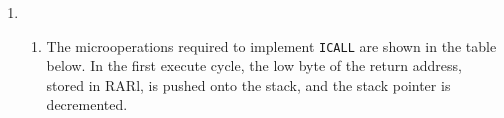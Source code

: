 \documentclass[11pt]{article}
\begin{document}
\begin{enumerate}[leftmargin=0.2in]
\begin{enumerate}
\begin{table}[H]
\begin{tabular}{ll}
\begin{tabular}{|p{0.1\linewidth}|>{\centering\arraybackslash}p{0.1\linewidth}|>{\centering\arraybackslash}p{0.1\linewidth}|>{\centering\arraybackslash}p{0.1\linewidth}|}
            ALU\_f    & xxxx  & xxxx  & xxxx  \\ \hline
            MC        & xx    & xx    & xx    \\ \hline
            RF\_wA    & 0     & 0     & 0     \\ \hline
            RF\_wB    & 0     & 0     & 0     \\ \hline
            MD        & x     & x     & 1     \\ \hline
            ME        & x     & x     & 1     \\ \hline
            DM\_r     & x     & x     & 0     \\ \hline
            DM\_w     & 0     & 0     & 1     \\ \hline
            MF        & x     & 1     & x     \\ \hline
            MG        & x     & 1     & x     \\ \hline
            Adder\_f  & xx    & 00    & xx    \\ \hline
            Inc\_Dec  & x     & x     & x     \\ \hline
            MH        & x     & 1     & x     \\ \hline
            MI        & x     & x     & x     \\ \hline
          \end{tabular}
          &
          \begin{tabular}{|p{0.1\linewidth}|>{\centering\arraybackslash}p{0.1\linewidth}|>{\centering\arraybackslash}p{0.1\linewidth}|}\hline
            \multicolumn{1}{|c|}{\multirow{2}{0.1\linewidth}{RAL Output}} & \multicolumn{2}{c|}{\texttt{STD Y+q, Rr}} \\ \cline{2-3} 
            \multicolumn{1}{|c|}{} & \multicolumn{1}{c|}{EX1} & \multicolumn{1}{c|}{EX2} \\ \hhline{|=|=|=|}
            wA & x  & x \\ \hline
            wB & x  & x \\ \hline
            rA & YH & x \\ \hline
            rB & YL & Rr \\ \hline
          \end{tabular}
        \end{tabular}
        \label{tab:2b}
      \end{table}
  \end{enumerate}

\item
  \begin{enumerate}
    \item The microoperations required to implement \texttt{ICALL} are shown in the table below. In the first execute cycle, the low byte of the return address, stored in RARl, is pushed onto the stack, and the stack pointer is decremented.\\


\end{enumerate}
\end{enumerate}
\end{document}
